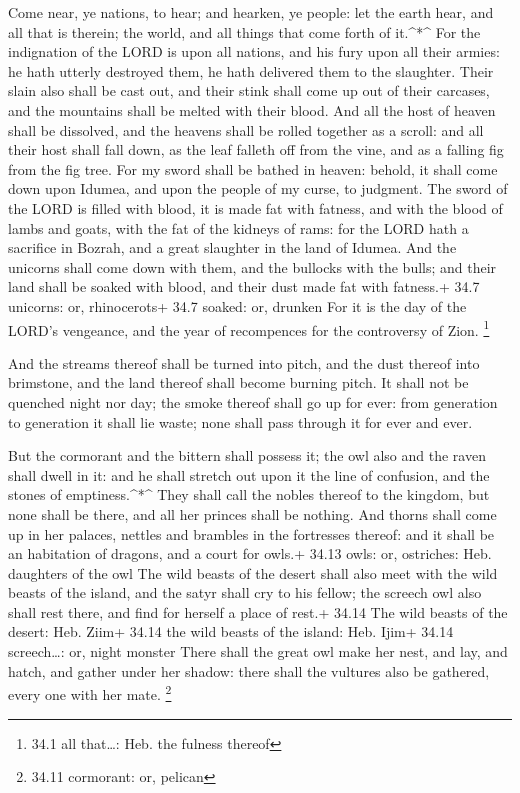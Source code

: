  Come near, ye nations, to hear; and hearken, ye people: let
the earth hear, and all that is therein; the world, and all things that
come forth of it.\^{}*\^{}  For the indignation of the LORD
is upon all nations, and his fury upon all their armies: he hath utterly
destroyed them, he hath delivered them to the slaughter. 
Their slain also shall be cast out, and their stink shall come up out of
their carcases, and the mountains shall be melted with their blood.
 And all the host of heaven shall be dissolved, and the
heavens shall be rolled together as a scroll: and all their host shall
fall down, as the leaf falleth off from the vine, and as a falling fig
from the fig tree.  For my sword shall be bathed in heaven:
behold, it shall come down upon Idumea, and upon the people of my curse,
to judgment.  The sword of the LORD is filled with blood, it
is made fat with fatness, and with the blood of lambs and goats, with
the fat of the kidneys of rams: for the LORD hath a sacrifice in Bozrah,
and a great slaughter in the land of Idumea.  And the
unicorns shall come down with them, and the bullocks with the bulls; and
their land shall be soaked with blood, and their dust made fat with
fatness.+ 34.7 unicorns: or, rhinocerots+ 34.7 soaked: or, drunken
 For it is the day of the LORD's vengeance, and the year of
recompences for the controversy of Zion. \footnote{34.1 all that\ldots:
  Heb. the fulness thereof}

 And the streams thereof shall be turned into pitch, and the
dust thereof into brimstone, and the land thereof shall become burning
pitch.  It shall not be quenched night nor day; the smoke
thereof shall go up for ever: from generation to generation it shall lie
waste; none shall pass through it for ever and ever.

 But the cormorant and the bittern shall possess it; the
owl also and the raven shall dwell in it: and he shall stretch out upon
it the line of confusion, and the stones of emptiness.\^{}*\^{}
 They shall call the nobles thereof to the kingdom, but
none shall be there, and all her princes shall be nothing. 
And thorns shall come up in her palaces, nettles and brambles in the
fortresses thereof: and it shall be an habitation of dragons, and a
court for owls.+ 34.13 owls: or, ostriches: Heb. daughters of the owl
 The wild beasts of the desert shall also meet with the
wild beasts of the island, and the satyr shall cry to his fellow; the
screech owl also shall rest there, and find for herself a place of
rest.+ 34.14 The wild beasts of the desert: Heb. Ziim+ 34.14 the wild
beasts of the island: Heb. Ijim+ 34.14 screech\ldots: or, night monster
 There shall the great owl make her nest, and lay, and
hatch, and gather under her shadow: there shall the vultures also be
gathered, every one with her mate. \footnote{34.11 cormorant: or,
  pelican}

